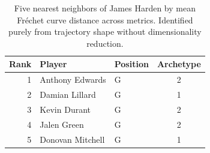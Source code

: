 \begin{table}[htbp]
  \centering\small
  \begin{tabular}{rllc}
    \toprule
    Rank & Player & Position & Archetype \\
    \midrule
    1 & Anthony Edwards & G & 2 \\
    2 & Damian Lillard & G & 1 \\
    3 & Kevin Durant & G & 2 \\
    4 & Jalen Green & G & 2 \\
    5 & Donovan Mitchell & G & 1 \\
    \bottomrule
  \end{tabular}
  \caption{Five nearest neighbors of James Harden by mean Fr\'{e}chet curve distance across metrics. Identified purely from trajectory shape without dimensionality reduction.}
  \label{tab:James_Harden_frechet_curve_neighbors}
\end{table}

